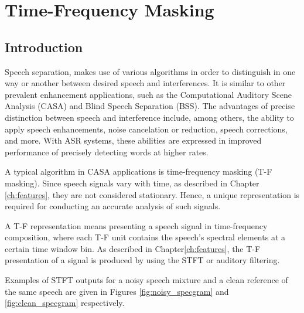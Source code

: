 \chapter{Time-Frequency Masking}\label{ch:tf_mask_ch}
\section{Introduction}
Speech separation, makes use of various
algorithms in order to distinguish in one way or another
between desired speech and interferences.
It is similar to other 
prevalent enhancement applications, such as the 
Computational Auditory Scene Analysis (CASA)\cite{BROWN1994297}
and Blind Speech Separation (BSS)\cite{6709849}.
The advantages of precise distinction 
between speech and interference include, among others,
the ability to apply speech enhancements, 
noise cancelation or reduction, speech corrections, and more.
With ASR systems, these abilities are expressed in 
improved performance of precisely detecting words
at higher rates.

A typical algorithm in CASA applications is 
time-frequency masking (T-F masking).
Since speech signals vary with time, 
as described in Chapter \;\ref{ch:features}, 
they are not considered stationary. 
Hence, a unique representation is required 
for conducting an accurate analysis of such signals. 

A T-F representation means presenting a speech 
signal in time-frequency composition, 
where each T-F unit contains the 
speech's spectral elements at a certain time window bin. 
As described in Chapter\;\ref{ch:features}, 
the T-F presentation of a signal 
is produced by using the STFT or auditory filtering\cite{Xia2017UsingOR}.

Examples of STFT outputs for a noisy speech mixture and
a clean reference of the same speech are given in
Figures \ref{fig:noisy_specgram} and \ref{fig:clean_specgram} respectively. 

